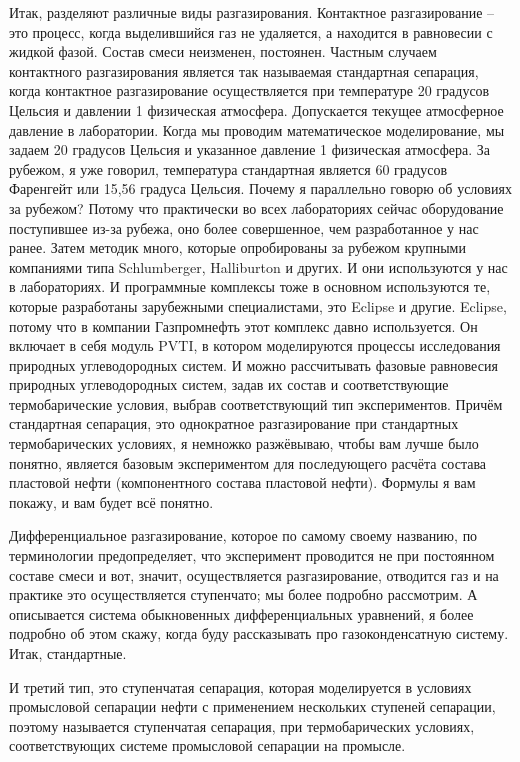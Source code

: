 \documentclass[main.tex]{subfiles}
\begin{document}
Итак, разделяют различные виды разгазирования.
Контактное разгазирование -- это процесс, когда выделившийся газ не удаляется, а находится в равновесии с жидкой фазой.
Состав смеси неизменен, постоянен.
Частным случаем контактного разгазирования является так называемая стандартная сепарация, когда контактное разгазирование осуществляется при температуре 20 градусов Цельсия и давлении 1 физическая атмосфера.
Допускается текущее атмосферное давление в лаборатории.
Когда мы проводим математическое моделирование, мы задаем 20 градусов Цельсия и указанное давление 1 физическая атмосфера.
За рубежом, я уже говорил, температура стандартная является 60 градусов Фаренгейт или 15,56 градуса Цельсия.
Почему я параллельно говорю об условиях за рубежом?
Потому что практически во всех лабораториях сейчас оборудование поступившее из-за рубежа, оно более совершенное, чем разработанное у нас ранее.
Затем методик много, которые опробированы за рубежом крупными компаниями типа Schlumberger, Halliburton и других.
И они используются у нас в лабораториях.
И программные комплексы тоже в основном используются те, которые разработаны зарубежными специалистами, это Eclipse и другие.
Eclipse, потому что в компании Газпромнефть этот комплекс давно используется.
Он включает в себя модуль PVTI, в котором моделируются процессы исследования природных углеводородных систем.
И можно рассчитывать фазовые равновесия природных углеводородных
систем, задав их состав и соответствующие термобарические условия, выбрав соответствующий тип экспериментов.
Причём стандартная сепарация, это однократное разгазирование при стандартных термобарических условиях, я немножко разжёвываю, чтобы вам лучше было понятно, является базовым экспериментом для последующего расчёта состава пластовой нефти (компонентного состава пластовой нефти).
Формулы я вам покажу, и вам будет всё понятно.

Дифференциальное разгазирование, которое по самому своему названию, по терминологии предопределяет, что эксперимент проводится не при постоянном составе смеси и вот, значит, осуществляется разгазирование, отводится газ и на практике это осуществляется ступенчато; мы более подробно рассмотрим.
А описывается система обыкновенных дифференциальных уравнений, я более подробно об этом скажу, когда буду рассказывать про газоконденсатную систему.
Итак, стандартные.

И третий тип, это ступенчатая сепарация, которая моделируется в условиях промысловой сепарации нефти с применением нескольких ступеней сепарации, поэтому называется ступенчатая сепарация, при термобарических условиях, соответствующих системе промысловой сепарации на промысле.
\end{document}
